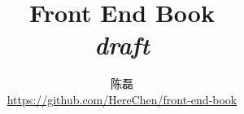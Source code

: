 \documentclass[oneside]{book}
\begin{document}
\frontmatter
\title{Front End Book \\ \textit{draft}}
\author{陈磊 \\ \href{https://github.com/HereChen/front-end-book}{https://github.com/HereChen/front-end-book}}
\maketitle



\tableofcontents

\mainmatter


% 
% 
% 
% 


% 


% 
% 
% 

% 
% 

\end{document}
